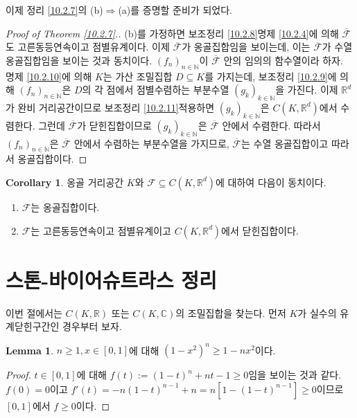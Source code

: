 \documentclass[11pt]{book}
\numberwithin{equation}{chapter}
\def\NN{\mathbb{N}}
\def\RR{\mathbb{R}}
\def\CC{\mathbb{C}}
\def\calF{\mathcal{F}}
\theoremstyle{definition}
\newtheorem{cor}[thm]{Corollary}
\newtheorem{lem}[thm]{Lemma}
\newenvironment{enum}
	{\begin{enumerate}[label=(\alph*), leftmargin=2\parindent]}
	{\end{enumerate}}
\begin{document}
이제 정리 \ref{10.2.7}의 (b)\(\Rightarrow\)(a)를 증명할 준비가 되었다.
\begin{proof}[Proof of Theorem \ref*{10.2.7}.]
    (b)를 가정하면 보조정리 \ref{10.2.8}\과 명제 \ref{10.2.4}에 의해 \(\overline{\calF}\)도 고른동등연속이고 점별유계이다. 이제 \(\overline{\calF}\)가 옹골집합임을 보이는데, 이는 \(\overline{\calF}\)가 수열 옹골집합임을 보이는 것과 동치이다. \((f_n)_{n \in \NN}\)이 \(\overline{\calF}\) 안의 임의의 함수열이라 하자. 명제 \ref{10.2.10}에 의해 \(K\)는 가산 조밀집합 \(D \subseteq K\)를 가지는데, 보조정리 \ref{10.2.9}에 의해 \((f_n)_{n \in \NN}\)은 \(D\)의 각 점에서 점별수렴하는 부분수열 \((g_k)_{k \in \NN}\)을 가진다. 이제 \(\RR^d\)가 완비 거리공간이므로 보조정리 \ref{10.2.11}\을 적용하면 \((g_k)_{k \in \NN}\)은 \(C(K, \RR^d)\)에서 수렴한다. 그런데 \(\overline{\calF}\)가 닫힌집합이므로 \((g_k)_{k \in \NN}\)은 \(\overline{\calF}\) 안에서 수렴한다. 따라서 \((f_n)_{n \in \NN}\)은 \(\overline{\calF}\) 안에서 수렴하는 부분수열을 가지므로, \(\overline{\calF}\)는 수열 옹골집합이고 따라서 옹골집합이다.
\end{proof}

\begin{cor}
    옹골 거리공간 \(K\)와 \(\calF \subseteq C(K, \RR^d)\)에 대하여 다음이 동치이다.
    \begin{enum}
        \item \(\calF\)는 옹골집합이다.
        \item \(\calF\)는 고른동등연속이고 점별유계이고 \(C(K, \RR^d)\)에서 닫힌집합이다.
    \end{enum}
\end{cor}


\section{스톤-바이어슈트라스 정리}

이번 절에서는 \(C(K, \RR)\) 또는 \(C(K, \CC)\)의 조밀집합을 찾는다. 먼저 \(K\)가 실수의 유계닫힌구간인 경우부터 보자.

\begin{lem} \label{10.3.1}
    \(n \ge 1, x \in [0, 1]\)에 대해 \((1 - x^2)^n \ge 1 - nx^2\)이다.
\end{lem}
\begin{proof}
    \(t \in [0, 1]\)에 대해 \(f(t) := (1-t)^n +nt - 1 \ge 0\)임을 보이는 것과 같다. \(f(0) = 0\)이고 \(f'(t) = -n(1-t)^{n-1} + n = n[1 - (1-t)^{n-1}] \ge 0\)이므로 \([0, 1]\)에서 \(f \ge 0\)이다.
\end{proof}
\end{document}
